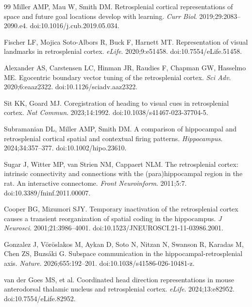 \documentclass[10pt,twocolumn]{article}
\begin{document}
{\begin{thebibliography}{99}
Miller AMP, Mau W, Smith DM. Retrosplenial cortical representations of space and future goal locations develop with learning. \emph{Curr Biol}. 2019;29:2083--2090.e4. doi:10.1016/j.cub.2019.05.034.

Fischer LF, Mojica Soto-Albors R, Buck F, Harnett MT. Representation of visual landmarks in retrosplenial cortex. \emph{eLife}. 2020;9:e51458. doi:10.7554/eLife.51458.

Alexander AS, Carstensen LC, Hinman JR, Raudies F, Chapman GW, Hasselmo ME. Egocentric boundary vector tuning of the retrosplenial cortex. \emph{Sci Adv}. 2020;6:eaaz2322. doi:10.1126/sciadv.aaz2322.

Sit KK, Goard MJ. Coregistration of heading to visual cues in retrosplenial cortex. \emph{Nat Commun}. 2023;14:1992. doi:10.1038/s41467-023-37704-5.

Subramanian DL, Miller AMP, Smith DM. A comparison of hippocampal and retrosplenial cortical spatial and contextual firing patterns. \emph{Hippocampus}. 2024;34:357--377. doi:10.1002/hipo.23610.

Sugar J, Witter MP, van Strien NM, Cappaert NLM. The retrosplenial cortex: intrinsic connectivity and connections with the (para)hippocampal region in the rat. An interactive connectome. \emph{Front Neuroinform}. 2011;5:7. doi:10.3389/fninf.2011.00007.

Cooper BG, Mizumori SJY. Temporary inactivation of the retrosplenial cortex causes a transient reorganization of spatial coding in the hippocampus. \emph{J Neurosci}. 2001;21:3986--4001. doi:10.1523/JNEUROSCI.21-11-03986.2001.

Gonzalez J, V\"or\"oslakos M, Aykan D, Soto N, Nitzan N, Swanson R, Karadas M, Chen ZS, Buzs\'aki G. Subspace communication in the hippocampal-retrosplenial axis. \emph{Nature}. 2026;655:192--201. doi:10.1038/s41586-026-10481-z.

van der Goes MS, et al. Coordinated head direction representations in mouse anterodorsal thalamic nucleus and retrosplenial cortex. \emph{eLife}. 2024;13:e82952. doi:10.7554/eLife.82952.
\end{thebibliography}
}
\end{document}
